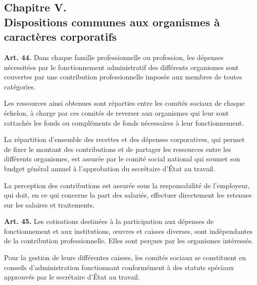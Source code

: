 \documentclass[french,twoside]{book} %
\newcommand{\labelchar}[1]{\textbf{\color{rubric} #1}}
\def\mednobreak{\ifdim\lastskip<\medskipamount
  \removelastskip\nopagebreak\medskip\fi}
\newcommand{\labelblock}[1]{\medbreak{\noindent\color{rubric}\bfseries #1}\par\mednobreak}
\begin{document}
\subsection[{Chapitre V. Dispositions communes aux organismes à caractères corporatifs}]{Chapitre V. \\
Dispositions communes aux organismes à caractères corporatifs}
\noindent \labelchar{Art. 44.} Dans chaque famille professionnelle ou profession, les dépenses nécessitées par le fonctionnement administratif des différents organismes sont couvertes par une contribution professionnelle imposée aux membres de toutes catégories.\par
Les ressources ainsi obtenues sont réparties entre les comités sociaux de chaque échelon, à charge par ces comités de reverser aux organismes qui leur sont rattachés les fonds ou compléments de fonds nécessaires à leur fonctionnement.\par
La répartition d’ensemble des recettes et des dépenses corporatives, qui permet de fixer le montant des contributions et de partager les ressources entre les différents organismes, est assurée par le comité social national qui soumet son budget général annuel à l’approbation du secrétaire d’État au travail.\par
La perception des contributions est assurée sous la responsabilité de l’employeur, qui doit, en ce qui concerne la part des salariés, effectuer directement les retenues sur les salaires et traitements.\par
\bigbreak
\noindent \labelchar{Art. 45.} Les cotisations destinées à la participation aux dépenses de fonctionnement et aux institutions, œuvres et caisses diverses, sont indépendantes de la contribution professionnelle. Elles sont perçues par les organismes intéressés.\par
Pour la gestion de leurs différentes caisses, les comités sociaux se constituent en conseils d’administration fonctionnant conformément à des statuts spéciaux approuvés par le secrétaire d’État au travail.\par

\labelblock{Le patrimoine corporatif commun}
\end{document}
